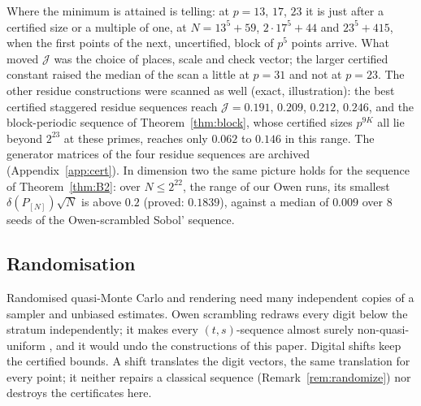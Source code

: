 Where the minimum is attained is telling: at $p=13$, $17$, $23$ it is just after a certified size or a multiple of one, at $N=13^5+59$, $2\cdot17^5+44$ and $23^5+415$, when the first points of the next, uncertified, block of $p^5$ points arrive. What moved $\mathcal J$ was the choice of places, scale and check vector; the larger certified constant raised the median of the scan a little at $p=31$ and not at $p=23$. The other residue constructions were scanned as well (exact, illustration): the best certified staggered residue sequences reach $\mathcal J=0.191$, $0.209$, $0.212$, $0.246$, and the block-periodic sequence of Theorem~\ref{thm:block}, whose certified sizes $p^{9K}$ all lie beyond $2^{23}$ at these primes, reaches only $0.062$ to $0.146$ in this range. The generator matrices of the four residue sequences are archived (Appendix~\ref{app:cert}). In dimension two the same picture holds for the sequence of Theorem~\ref{thm:B2}: over $N\le2^{22}$, the range of our Owen runs, its smallest $\delta(P_{[N]})\sqrt N$ is above $0.2$ (proved: $0.1839$), against a median of $0.009$ over $8$ seeds of the Owen-scrambled Sobol' sequence.

\subsection{Randomisation}
Randomised quasi-Monte Carlo and rendering need many independent copies of a sampler and unbiased estimates. Owen scrambling redraws every digit below the stratum independently; it makes every $(t,s)$-sequence almost surely non-quasi-uniform \cite{Suz26}, and it would undo the constructions of this paper. Digital shifts keep the certified bounds. A shift translates the digit vectors, the same translation for every point; it neither repairs a classical sequence (Remark~\ref{rem:randomize}) nor destroys the certificates here.

